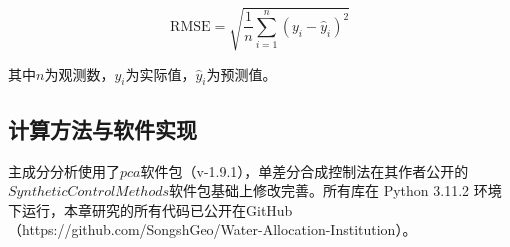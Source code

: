 \begin{equation}
    \label{ch5:eq:RMSE}
    \text{RMSE} = \sqrt{\frac{1}{n}\sum_{i=1}^{n}{(y_i-\hat{y}_i)}^2} 
\end{equation}

其中$n$为观测数，$y_i$为实际值，$\hat{y}_i$为预测值。

\subsection{计算方法与软件实现}

主成分分析使用了$pca$软件包（v-1.9.1）\cite{Taskesen_pca_A_Python_2020}，单差分合成控制法在其作者公开的$Synthetic Control Methods$软件包基础上修改完善\cite{arkhangelsky2021}。所有库在 Python 3.11.2 环境下运行，本章研究的所有代码已公开在GitHub（https://github.com/SongshGeo/Water-Allocation-Institution）。
